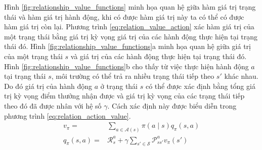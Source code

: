 	Hình \ref{fig:relationship_value_functions} minh họa quan hệ giữa hàm giá trị trạng thái và hàm giá trị hành động, khi có được hàm giá trị này ta có thể có được hàm giá trị còn lại. Phương trình \ref{eq:relation_value_action} xác hàm giá trị của một trạng thái bằng giá trị kỳ vọng giá trị của các hành động thực hiện tại trạng thái đó. Hình \ref{fig:relationship_value_functions}a minh họa quan hệ giữa giá trị của một trạng thái $s$ và giá trị của các hành động thực hiện tại trạng thái đó. Hình \ref{fig:relationship_value_functions}b cho thấy từ việc thực hiện hành động $a$ tại trạng thái $s$, môi trường có thể trả ra nhiều trạng thái tiếp theo $s'$ khác nhau. Do đó giá trị của hành động $a$ ở trạng thái $s$ có thể được xác định bằng tổng giá trị kỳ vọng điểm thưởng nhận được và giá trị kỳ vọng của các trạng thái tiếp theo đó đã được nhân với hệ số $\gamma$. Cách xác định này được biểu diễn trong phương trình \ref{eq:relation_action_value}.
	\begin{align}
		v_{\pi} = {} & \sum_{a \in \mathcal{A}(s)}^{}\pi(a \mid s)q_{\pi}(s,a) \label{eq:relation_value_action}\\
		q_{\pi}(s,a) = {} & \mathcal{R}_{s}^{a} + \gamma \sum_{s' \in \mathcal{S}}^{}\mathcal{P}_{ss'}^{a}v_{\pi}(s') \label{eq:relation_action_value}
	\end{align}
